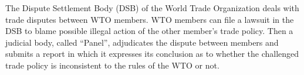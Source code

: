 The Dispute Settlement Body (DSB) of the World Trade Organization deals with trade disputes between WTO members.
WTO members can file a lawsuit in the DSB to blame possible illegal action of the other member's trade policy.
Then a judicial body, called ``Panel'', adjudicates the dispute between members and submits a report in which it expresses
its conclusion as to whether the challenged trade policy is inconsistent to the rules of the WTO or not. %

 

